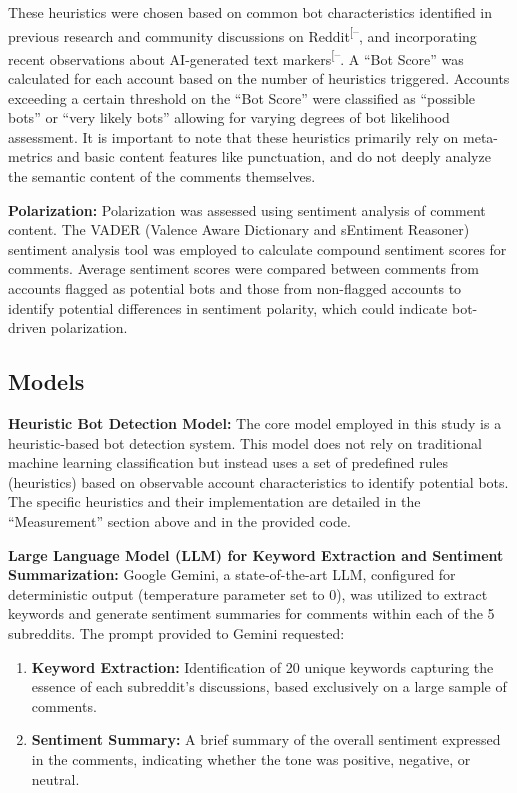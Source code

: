 \documentclass[
  12pt,
  letterpaper,
  DIV=11,
  numbers=noendperiod]{scrartcl}
\providecommand{\tightlist}{%
  \setlength{\itemsep}{0pt}\setlength{\parskip}{0pt}}\usepackage{longtable,booktabs,array}
\begin{document}
These heuristics were chosen based on common bot characteristics
identified in previous research and community discussions on
Reddit\textsuperscript{{[}--\citeproc{ref-botproblem7daystodie}{17}{]}},
and incorporating recent observations about AI-generated text
markers\textsuperscript{{[}--\citeproc{ref-nightwateremdash}{14}{]}}.
A ``Bot Score'' was calculated for each account based on the number of
heuristics triggered. Accounts exceeding a certain threshold on the
``Bot Score'' were classified as ``possible bots'' or ``very likely
bots'' allowing for varying degrees of bot likelihood assessment. It is
important to note that these heuristics primarily rely on meta-metrics
and basic content features like punctuation, and do not deeply analyze
the semantic content of the comments themselves.

\textbf{Polarization:} Polarization was assessed using sentiment
analysis of comment content. The VADER (Valence Aware Dictionary and
sEntiment Reasoner) sentiment analysis tool was employed to calculate
compound sentiment scores for comments. Average sentiment scores were
compared between comments from accounts flagged as potential bots and
those from non-flagged accounts to identify potential differences in
sentiment polarity, which could indicate bot-driven polarization.

\subsection{Models}\label{models}

\textbf{Heuristic Bot Detection Model:} The core model employed in this
study is a heuristic-based bot detection system. This model does not
rely on traditional machine learning classification but instead uses a
set of predefined rules (heuristics) based on observable account
characteristics to identify potential bots. The specific heuristics and
their implementation are detailed in the ``Measurement'' section above
and in the provided code.

\textbf{Large Language Model (LLM) for Keyword Extraction and Sentiment
Summarization:} Google Gemini, a state-of-the-art LLM, configured for
deterministic output (temperature parameter set to 0), was utilized to
extract keywords and generate sentiment summaries for comments within
each of the 5 subreddits. The prompt provided to Gemini requested:

\begin{enumerate}
\def\labelenumi{\arabic{enumi}.}
\tightlist
\item
  \textbf{Keyword Extraction:} Identification of 20 unique keywords
  capturing the essence of each subreddit's discussions, based
  exclusively on a large sample of comments.
\item
  \textbf{Sentiment Summary:} A brief summary of the overall sentiment
  expressed in the comments, indicating whether the tone was positive,
  negative, or neutral.
\end{enumerate}
\end{document}
